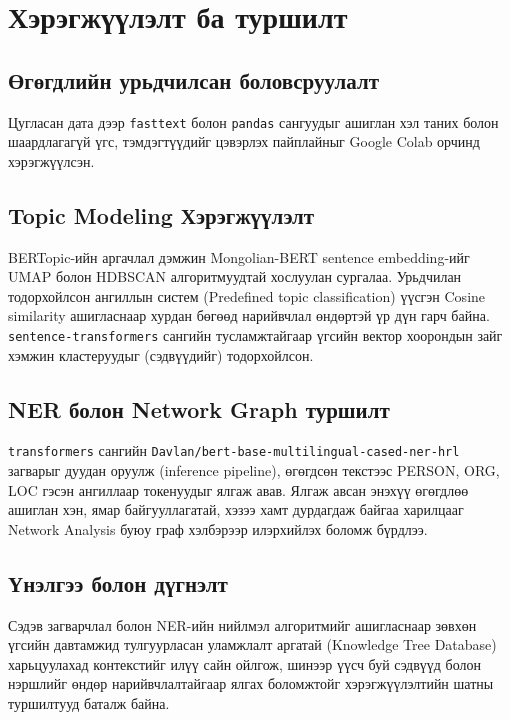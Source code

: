 \chapter{Хэрэгжүүлэлт ба туршилт}
\section{Өгөгдлийн урьдчилсан боловсруулалт}
Цугласан дата дээр \texttt{fasttext} болон \texttt{pandas} сангуудыг ашиглан хэл таних болон шаардлагагүй үгс, тэмдэгтүүдийг цэвэрлэх пайплайныг Google Colab орчинд хэрэгжүүлсэн.

\section{Topic Modeling Хэрэгжүүлэлт}
BERTopic-ийн аргачлал дэмжин Mongolian-BERT sentence embedding-ийг UMAP болон HDBSCAN алгоритмуудтай хослуулан сургалаа. Урьдчилан тодорхойлсон ангиллын систем (Predefined topic classification) үүсгэн Cosine similarity ашигласнаар хурдан бөгөөд нарийвчлал өндөртэй үр дүн гарч байна. \texttt{sentence-transformers} сангийн тусламжтайгаар үгсийн вектор хоорондын зайг хэмжин кластеруудыг (сэдвүүдийг) тодорхойлсон.

\section{NER болон Network Graph туршилт}
\texttt{transformers} сангийн \texttt{Davlan/bert-base-multilingual-cased-ner-hrl} загварыг дуудан оруулж (inference pipeline), өгөгдсөн текстээс PERSON, ORG, LOC гэсэн ангиллаар токенуудыг ялгаж авав. Ялгаж авсан энэхүү өгөгдлөө ашиглан хэн, ямар байгууллагатай, хэзээ хамт дурдагдаж байгаа харилцааг Network Analysis буюу граф хэлбэрээр илэрхийлэх боломж бүрдлээ.

\section{Үнэлгээ болон дүгнэлт}
Сэдэв загварчлал болон NER-ийн нийлмэл алгоритмийг ашигласнаар зөвхөн үгсийн давтамжид тулгуурласан уламжлалт аргатай (Knowledge Tree Database) харьцуулахад контекстийг илүү сайн ойлгож, шинээр үүсч буй сэдвүүд болон нэршлийг өндөр нарийвчлалтайгаар ялгах боломжтойг хэрэгжүүлэлтийн шатны туршилтууд баталж байна.
